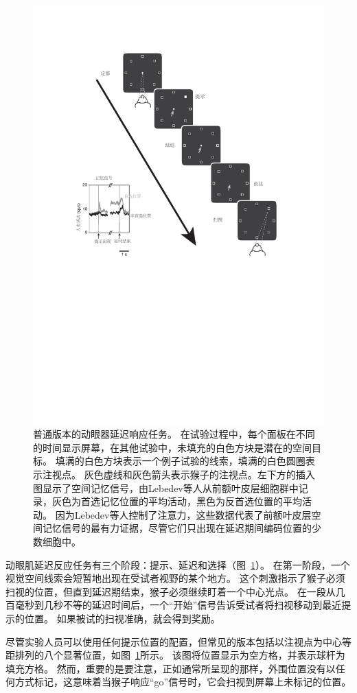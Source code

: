 \begin{figure}
	\centering
	\includegraphics[width=0.75\linewidth]{chap5/Fig_5_4}
	\caption{普通版本的动眼器延迟响应任务。
		在试验过程中，每个面板在不同的时间显示屏幕，在其他试验中，未填充的白色方块是潜在的空间目标。
		填满的白色方块表示一个例子试验的线索，填满的白色圆圈表示注视点。
		灰色虚线和灰色箭头表示猴子的注视点。左下方的插入图显示了空间记忆信号，由Lebedev等人\cite{lebedev2004representation}从前额叶皮层细胞群中记录，灰色为首选记忆位置的平均活动，黑色为反首选位置的平均活动。
		因为Lebedev等人控制了注意力，这些数据代表了前额叶皮层空间记忆信号的最有力证据，尽管它们只出现在延迟期间编码位置的少数细胞中。}
	\label{fig:fig_5_4}
\end{figure}


动眼肌延迟反应任务有三个阶段：提示、延迟和选择（图~\ref{fig:fig_5_4}）。
在第一阶段，一个视觉空间线索会短暂地出现在受试者视野的某个地方。
这个刺激指示了猴子必须扫视的位置，但直到延迟期结束，猴子必须继续盯着一个中心光点。
在一段从几百毫秒到几秒不等的延迟时间后，一个“开始”信号告诉受试者将扫视移动到最近提示的位置。
如果被试的扫视准确，就会得到奖励。


尽管实验人员可以使用任何提示位置的配置，但常见的版本包括以注视点为中心等距排列的八个显著位置，如图~\ref{fig:fig_5_4}所示。
该图将位置显示为空方格，并表示球杆为填充方格。
然而，重要的是要注意，正如通常所呈现的那样，外围位置没有以任何方式标记，这意味着当猴子响应“go”信号时，它会扫视到屏幕上未标记的位置。


